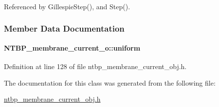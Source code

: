 Referenced by GillespieStep(), and Step().



\subsubsection{Member Data Documentation}
\paragraph[{uniform}]{ {\bf NTBP\_\-membrane\_\-current\_\-o::uniform}}\hfill\label{class_n_t_b_p__membrane__current__o_ac36dc6671fd6a563c160942545010a9d}


Definition at line 128 of file ntbp\_\-membrane\_\-current\_\-obj.h.



The documentation for this class was generated from the following file:\begin{DoxyCompactItemize}
\item 
\hyperlink{ntbp__membrane__current__obj_8h}{ntbp\_\-membrane\_\-current\_\-obj.h}\end{DoxyCompactItemize}
